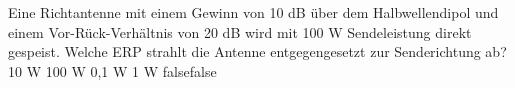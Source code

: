     {Eine Richtantenne mit einem Gewinn von 10 dB über dem Halbwellendipol und einem Vor-Rück-Verhältnis von 20 dB wird mit 100 W Sendeleistung direkt gespeist. Welche ERP strahlt die Antenne entgegengesetzt zur Senderichtung ab?}
    {10 W}
    {100 W}
    {0,1 W}
    {1 W}
    {false}{false}